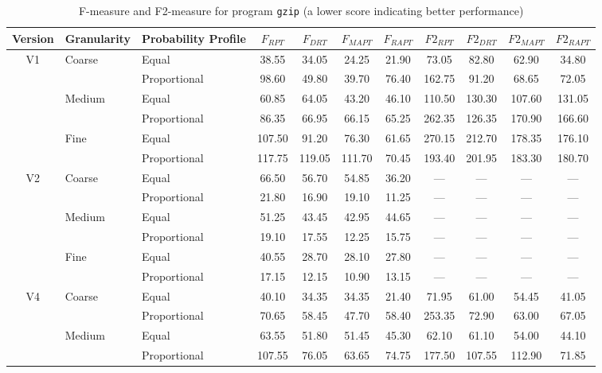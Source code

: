 \documentclass[10pt,journal,cspaper,compsoc,onecolumn]{IEEEtran}
\begin{document}
\begin{table}
\caption{F-measure and F2-measure for program \texttt{gzip} (a lower score indicating better performance)}
\label{tab:Fgzip}
\centering
\begin{tabular}{|c|l|l|c|c|c|c|c|c|c|c|} \hline
Version	& Granularity	& Probability Profile	& $F_{RPT}$	& $F_{DRT}$	& $F_{MAPT}$	& $F_{RAPT}$	& $F2_{RPT}$	& $F2_{DRT}$	& $F2_{MAPT}$	 & $F2_{RAPT}$	\\ \hline
V1	& Coarse	& Equal	& 38.55	& 34.05	& 24.25	& 21.90	& 73.05	& 82.80	& 62.90	& 34.80	\\ \cline{3-11}
	& 	& Proportional	& 98.60	& 49.80	& 39.70	& 76.40	& 162.75	& 91.20	& 68.65	& 72.05	\\ \cline{2-11}
	& Medium	& Equal	& 60.85	& 64.05	& 43.20	& 46.10	& 110.50	& 130.30	& 107.60	& 131.05	\\ \cline{3-11}
	& 	& Proportional	& 86.35	& 66.95	& 66.15	& 65.25	& 262.35	& 126.35	& 170.90	& 166.60	\\ \cline{2-11}
	& Fine	& Equal	& 107.50	& 91.20	& 76.30	& 61.65	& 270.15	& 212.70	& 178.35	& 176.10	\\ \cline{3-11}
	& 	& Proportional	& 117.75	& 119.05	& 111.70	& 70.45	& 193.40	& 201.95	& 183.30	& 180.70	\\ \hline
V2	& Coarse	& Equal	& 66.50	& 56.70	& 54.85	& 36.20	& ---	& ---	& ---	& ---	\\ \cline{3-11}
	& 	& Proportional	& 21.80	& 16.90	& 19.10	& 11.25	& ---	& ---	& ---	& ---	\\ \cline{2-11}
	& Medium	& Equal	& 51.25	& 43.45	& 42.95	& 44.65	& ---	& ---	& ---	& ---	\\ \cline{3-11}
	& 	& Proportional	& 19.10	& 17.55	& 12.25	& 15.75	& ---	& ---	& ---	& ---	\\ \cline{2-11}
	& Fine	& Equal	& 40.55	& 28.70	& 28.10	& 27.80	& ---	& ---	& ---	& ---	\\ \cline{3-11}
	& 	& Proportional	& 17.15	& 12.15	& 10.90	& 13.15	& ---	& ---	& ---	& ---	\\ \hline
V4	& Coarse	& Equal	& 40.10	& 34.35	& 34.35	& 21.40	& 71.95	& 61.00	& 54.45	& 41.05	\\ \cline{3-11}
	& 	& Proportional	& 70.65	& 58.45	& 47.70	& 58.40	& 253.35	& 72.90	& 63.00	& 67.05	\\ \cline{2-11}
	& Medium	& Equal	& 63.55	& 51.80	& 51.45	& 45.30	& 62.10	& 61.10	& 54.00	& 44.10	\\ \cline{3-11}
	& 	& Proportional	& 107.55	& 76.05	& 63.65	& 74.75	& 177.50	& 107.55	& 112.90	& 71.85	\\ \cline{2-11}

\end{tabular}
\end{table}
\end{document}
